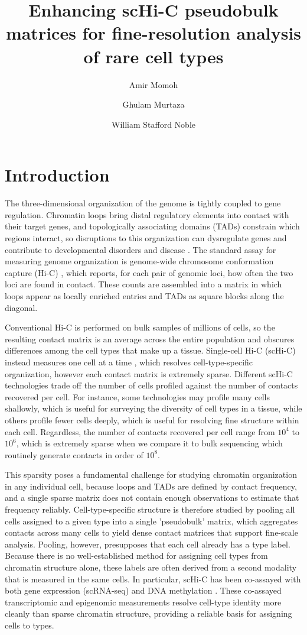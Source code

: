 \documentclass{article}
\title{Enhancing scHi-C pseudobulk matrices for fine-resolution analysis of rare cell types}
\author[1]{Amir Momoh}
\author[1]{Ghulam Murtaza}
\author[1,2]{William Stafford Noble}
\affil[1]{Department of Genome Sciences, University of Washington}
\affil[2]{Paul G.\ Allen School of Computer Science and Engineering, University of Washington}
\date{}
\begin{document}
\maketitle

\section{Introduction}
The three-dimensional organization of the genome is tightly coupled to gene regulation.
Chromatin loops bring distal regulatory elements into contact with their target genes, and topologically associating domains (TADs) constrain which regions interact, so disruptions to this organization can dysregulate genes and contribute to developmental disorders and disease \cite{}.
The standard assay for measuring genome organization is genome-wide chromosome conformation capture (Hi-C) \cite{}, which reports, for each pair of genomic loci, how often the two loci are found in contact.
These counts are assembled into a matrix in which loops appear as locally enriched entries and TADs as square blocks along the diagonal.

Conventional Hi-C is performed on bulk samples of millions of cells, so the resulting contact matrix is an average across the entire population and obscures differences among the cell types that make up a tissue.
Single-cell Hi-C (scHi-C) instead measures one cell at a time \cite{}, which resolves cell-type-specific organization, however each contact matrix is extremely sparse.
Different scHi-C technologies trade off the number of cells profiled against the number of contacts recovered per cell. 
For instance, some technologies \cite{} may profile many cells shallowly, which is useful for surveying the diversity of cell types in a tissue, while others profile fewer cells deeply, which is useful for resolving fine structure within each cell. 
Regardless, the number of contacts recovered per cell range from $10^4$ to $10^6$, which is extremely sparse when we compare it to bulk sequencing which routinely generate contacts in order of $10^8$.

This sparsity poses a fundamental challenge for studying chromatin organization in any individual cell, because loops and TADs are defined by contact frequency, and a single sparse matrix does not contain enough observations to estimate that frequency reliably.
Cell-type-specific structure is therefore studied by pooling all cells assigned to a given type into a single 'pseudobulk' matrix, which aggregates contacts across many cells to yield dense contact matrices that support fine-scale analysis.
Pooling, however, presupposes that each cell already has a type label.
Because there is no well-established method for assigning cell types from chromatin structure alone, these labels are often derived from a second modality that is measured in the same cells.
In particular, scHi-C has been co-assayed with both gene expression (scRNA-seq) \cite{} and DNA methylation \cite{}. 
These co-assayed transcriptomic and epigenomic measurements resolve cell-type identity more cleanly than sparse chromatin structure, providing a reliable basis for assigning cells to types.
\end{document}

